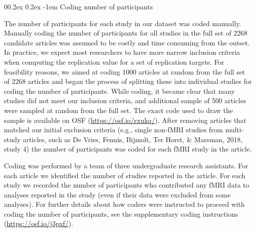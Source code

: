 \documentclass[
  man,floatsintext]{apa6}
\makeatletter
\let\oldparagraph\paragraph
\renewcommand{\paragraph}[1]{\oldparagraph{#1}\mbox{}}
\renewcommand{\paragraph}{\@startsection{paragraph}{4}{\parindent}%
  {0\baselineskip \@plus 0.2ex \@minus 0.2ex}%
  {-1em}%
  {\normalfont\normalsize\bfseries\itshape\typesectitle}}
\makeatother
\begin{document}
\hypertarget{coding-number-of-participants}{%
\paragraph{Coding number of participants}\label{coding-number-of-participants}}

The number of participants for each study in our dataset was coded manually. Manually coding the number of participants for all studies in the full set of 2268 candidate articles was assumed to be costly and time consuming from the outset. In practice, we expect most researchers to have more narrow inclusion criteria when computing the replication value for a set of replication targets. For feasibility reasons, we aimed at coding 1000 articles at random from the full set of 2268 articles and began the process of splitting these into individual studies for coding the number of participants. While coding, it became clear that many studies did not meet our inclusion criteria, and additional sample of 500 articles were sampled at random from the full set. The exact code used to draw the sample is available on OSF (\url{https://osf.io/rxukq/}). After removing articles that matched our initial exclusion criteria (e.g., single non-fMRI studies from multi-study articles, such as De Vries, Fennis, Bijmolt, Ter Horst, \& Marsman, 2018, study 4) the number of participants was coded for each fMRI study in the article.

Coding was performed by a team of three undergraduate research assistants. For each article we identified the number of studies reported in the article. For each study we recorded the number of participants who contributed any fMRI data to analyses reported in the study (even if their data were excluded from some analyses). For further details about how coders were instructed to proceed with coding the number of participants, see the supplementary coding instructions (\url{https://osf.io/j3pxf/}).
\end{document}
